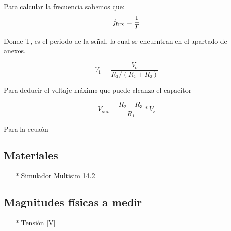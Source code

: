 \documentclass[osajnl,twocolumn,showpacs,superscriptaddress,10pt]{revtex4-1}
\begin{document}

Para calcular la frecuencia sabemos que:\\

\begin{equation}
f_{\textup{frec}} = \dfrac{1}{T}
\label{frec}
\end{equation}

Donde T, es el periodo de la señal, la cual se encuentran en el apartado de anexos.

\begin{equation}
V_{1} = \dfrac{V_{o}}{R_{3}/(R_{2} + R_{3})}
\label{V_in}
\end{equation}

Para deducir el voltaje máximo que puede alcanza el capacitor.

\begin{equation}
V_{out} = \dfrac{R_{2} + R_{3}}{R_{1}} * V_{c}
\label{V_0}
\end{equation}

Para la ecuaón


\subsection{Materiales}

\begin{itemize}
    \item[*] Simulador Multisim 14.2
\end{itemize}


\subsection{Magnitudes físicas a medir}

\begin{itemize}
    \item[*] Tensión [V]
\end{itemize}
\end{document}
